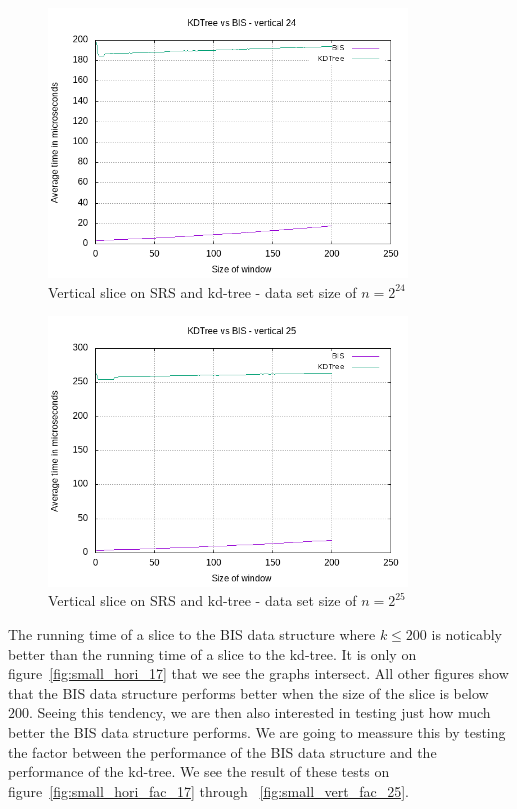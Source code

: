 \begin{figure}[h]
    \centering
    \includegraphics[width = 0.85\textwidth]{pictures/analysis/smalls/vert_24.png}
    \caption{Vertical slice on SRS and kd-tree - data set size of $n=2^{24}$}\label{fig:small_vert_24}
\end{figure}

\begin{figure}[h]
    \centering
    \includegraphics[width = 0.85\textwidth]{pictures/analysis/smalls/vert_25.png}
    \caption{Vertical slice on SRS and kd-tree - data set size of $n=2^{25}$}\label{fig:small_vert_25}
\end{figure}

The running time of a slice to the BIS data structure where $k \leq 200$ is noticably better than the running time of a slice to the kd-tree. It is only on figure~\ref{fig:small_hori_17} that we see the graphs intersect. All other figures show that the BIS data structure performs better when the size of the slice is below $200$. Seeing this tendency, we are then also interested in testing just how much better the BIS data structure performs. We are going to meassure this by testing the factor between the performance of the BIS data structure and the performance of the kd-tree. We see the result of these tests on figure~\ref{fig:small_hori_fac_17} through ~\ref{fig:small_vert_fac_25}.

